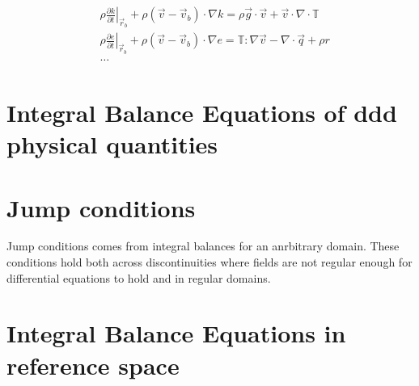 \documentclass[letterpaper,10pt,english]{jupyterBook}
\begin{document}
\sphinxAtStartPar
{}
\begin{equation*}
\begin{split}\begin{aligned}
 & \rho \left.\frac{\partial k}{\partial t}\right|_{\vec{r}_b} + \rho \left( \vec{v} - \vec{v}_b \right) \cdot \nabla k = \rho \vec{g} \cdot \vec{v} + \vec{v} \cdot \nabla \cdot \mathbb{T} \\
 & \rho \left.\frac{\partial e}{\partial t}\right|_{\vec{r}_b} + \rho \left( \vec{v} - \vec{v}_b \right) \cdot \nabla e = \mathbb{T} : \nabla \vec{v} - \nabla \cdot \vec{q} + \rho r \\
 & \dots
\end{aligned}\end{split}
\end{equation*}


\sphinxstepscope


\section{Integral Balance Equations of ddd physical quantities}
\label{\detokenize{ch/continuum/balance-derived-integral:integral-balance-equations-of-ddd-physical-quantities}}\label{\detokenize{ch/continuum/balance-derived-integral:continuum-governing-equations-primary-integral}}\label{\detokenize{ch/continuum/balance-derived-integral::doc}}


\sphinxstepscope


\section{Jump conditions}
\label{\detokenize{ch/continuum/balance-jump:jump-conditions}}\label{\detokenize{ch/continuum/balance-jump:continuum-governing-equations-jump-conditions}}\label{\detokenize{ch/continuum/balance-jump::doc}}
\sphinxAtStartPar
Jump conditions comes from integral balances for an anrbitrary domain. These conditions hold both across discontinuities \sphinxhyphen{} where fields are not regular enough for differential equations to hold \sphinxhyphen{} and in regular domains.

\sphinxstepscope


\section{Integral Balance Equations in reference space}
\label{\detokenize{ch/continuum/balance-reference-integral:integral-balance-equations-in-reference-space}}\label{\detokenize{ch/continuum/balance-reference-integral:continuum-governing-equations-reference-integral}}\label{\detokenize{ch/continuum/balance-reference-integral::doc}}
\end{document}
